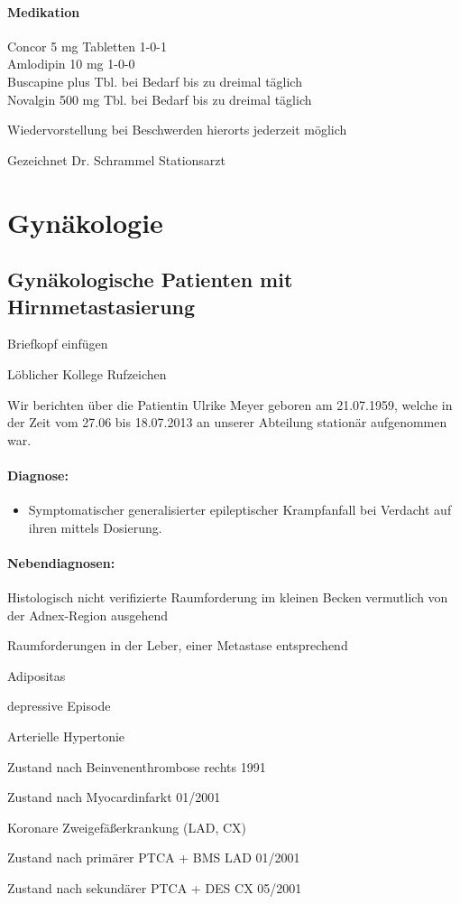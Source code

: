 \paragraph{Medikation} 

Concor 5 mg Tabletten 1-0-1 \\
Amlodipin 10 mg
1-0-0\\
Buscapine plus Tbl. bei Bedarf bis zu dreimal täglich \\
Novalgin 500 mg Tbl. bei Bedarf bis zu dreimal täglich

Wiedervorstellung bei Beschwerden hierorts jederzeit möglich

Gezeichnet Dr. Schrammel 
Stationsarzt 


\section{Gynäkologie}

\subsection{Gynäkologische Patienten mit Hirnmetastasierung}

Briefkopf einfügen

Löblicher Kollege Rufzeichen

Wir berichten über die Patientin Ulrike Meyer geboren am
21.07.1959, welche in der Zeit vom 27.06 bis 18.07.2013 an
unserer Abteilung stationär aufgenommen war. 


\paragraph{Diagnose:}

\begin{itemize}
  \item Symptomatischer generalisierter epileptischer Krampfanfall
bei Verdacht auf ihren mittels Dosierung.
\end{itemize}



\paragraph{Nebendiagnosen:}
\begin{compactitem}
\item 
Histologisch nicht verifizierte Raumforderung im kleinen
Becken vermutlich von der Adnex-Region ausgehend 
\item Raumforderungen in der Leber, einer Metastase
entsprechend
  \item Adipositas 
  \item   depressive Episode 
  \item   Arterielle
Hypertonie 
\item Zustand nach Beinvenenthrombose rechts 1991
\item Zustand nach Myocardinfarkt 01/2001 
\item Koronare
Zweigefäßerkrankung (LAD,
CX) 
\item Zustand nach primärer PTCA + BMS LAD 01/2001
\item Zustand nach sekundärer PTCA + DES CX 05/2001
\end{compactitem}


